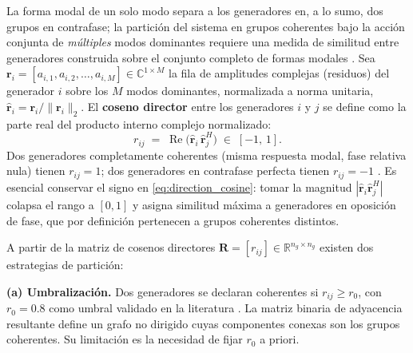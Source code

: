 La forma modal de un solo modo separa a los generadores en, a lo sumo,
dos grupos en contrafase; la partición del sistema en grupos coherentes
bajo la acción conjunta de \emph{múltiples} modos dominantes requiere una
medida de similitud entre generadores construida sobre el conjunto
completo de formas modales \cite{jiang2021,li2018cwt}. Sea
$\mathbf{r}_i = [a_{i,1}, a_{i,2}, \ldots, a_{i,M}] \in \mathbb{C}^{1\times M}$
la fila de amplitudes complejas (residuos) del generador $i$ sobre los $M$
modos dominantes, normalizada a norma unitaria,
$\hat{\mathbf{r}}_i = \mathbf{r}_i / \lVert\mathbf{r}_i\rVert_2$. El
\textbf{coseno director} entre los generadores $i$ y $j$ se define como la
parte real del producto interno complejo normalizado:
\begin{equation}
    r_{ij} \;=\;
    \operatorname{Re}\bigl( \hat{\mathbf{r}}_i\, \hat{\mathbf{r}}_j^{H} \bigr)
    \;\in\; [-1,\, 1].
    \label{eq:direction_cosine}
\end{equation}
Dos generadores completamente coherentes (misma respuesta modal, fase
relativa nula) tienen $r_{ij}=1$; dos generadores en contrafase perfecta
tienen $r_{ij}=-1$ \cite{li2018cwt,li2020era}. Es esencial conservar el
signo en \eqref{eq:direction_cosine}: tomar la magnitud
$|\hat{\mathbf{r}}_i \hat{\mathbf{r}}_j^{H}|$ colapsa el rango a $[0,1]$ y
asigna similitud máxima a generadores en oposición de fase, que por
definición pertenecen a grupos coherentes distintos.

A partir de la matriz de cosenos directores
$\mathbf{R} = [r_{ij}] \in \mathbb{R}^{n_g \times n_g}$ existen dos
estrategias de partición:

\textbf{(a) Umbralización.} Dos generadores se declaran coherentes si
$r_{ij} \ge r_0$, con $r_0 = 0.8$ como umbral validado en la literatura
\cite{li2018cwt,li2020era}. La matriz binaria de adyacencia resultante
define un grafo no dirigido cuyas componentes conexas son los grupos
coherentes. Su limitación es la necesidad de fijar $r_0$ a priori.

